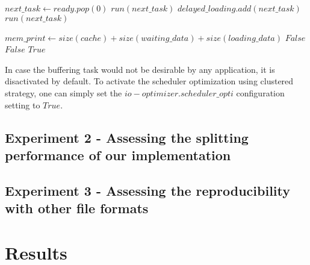 \documentclass[conference]{IEEEtran}
\begin{document}

\begin{algorithm}
  \caption{$main\_scheduling\_function()$}
  \label{algo:mainscheduling}
  \begin{algorithmic}
      \STATE $next\_task \leftarrow ready.pop(0)$
          \STATE $run(next\_task)$
        \ELSE
          \STATE $delayed\_loading.add(next\_task)$
        \ENDIF
      \ELSE
        \STATE $run(next\_task)$
      \ENDIF
    \ENDWHILE
  \end{algorithmic}
\end{algorithm}

\begin{algorithm}
  \caption{$launch\_buffer\_task(next\_buffer\_task)$}
  \label{algo:launchbuffertask}
  \begin{algorithmic}
    \STATE $mem\_print \leftarrow size(cache) + size(waiting\_data) + size(loading\_data)$
      \RETURN $False$
    \ENDIF
      \RETURN $False$
    \ENDIF
    \RETURN $True$
  \end{algorithmic}
\end{algorithm}

In case the buffering task would not be desirable by any application, it is disactivated by default. To activate the scheduler optimization using clustered strategy, one can simply set the $io-optimizer.scheduler\_opti$ configuration setting to $True$.

\subsection{Experiment 2 - Assessing the splitting performance of our implementation}

\subsection{Experiment 3 - Assessing the reproducibility with other file formats}

\section*{Results}
\end{document}
